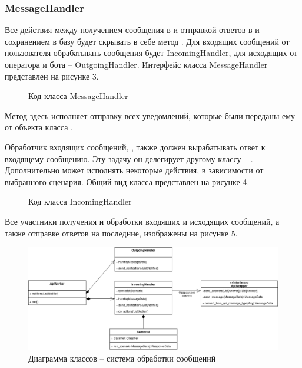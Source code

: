     \subsubsection{MessageHandler}
    Все действия между получением сообщения в  и отправкой ответов
    в  и сохранением в базу будет скрывать в себе метод
    . Для входящих сообщений от пользователя обрабатывать
    сообщения будет IncomingHandler, для исходящих от оператора и бота -- OutgoingHandler.
    Интерфейс класса MessageHandler представлен на рисунке 3.
    \begin{figure}[H]
        \centering
        
        \caption{Код класса MessageHandler}
        \label{fig:message_handler}
    \end{figure}

    Метод  здесь исполняет отправку всех уведомлений,
    которые были переданы ему от объекта класса .

    Обработчик входящих сообщений, ,
    также должен вырабатывать ответ к входящему сообщению. 
    Эту задачу он делегирует другому классу -- . 
    Дополнительно  может исполнять некоторые
    действия, в зависимости от выбранного сценария.
    Общий вид класса представлен на рисунке 4.
    \begin{figure}[H]
        \centering
        
        \caption{Код класса IncomingHandler}
        \label{fig:incoming_handler}
    \end{figure}

    Все участники получения и обработки входящих и исходящих сообщений, а также
    отправке ответов на последние, изображены на рисунке 5.
    \begin{figure}[H]
        \centering
        \includegraphics[width=\linewidth]{static/ClassDiagram_ioprocess.png}
        \caption{Диаграмма классов -- система обработки сообщений}
        \label{fig:class-diagram-ioprocess}
    \end{figure}


